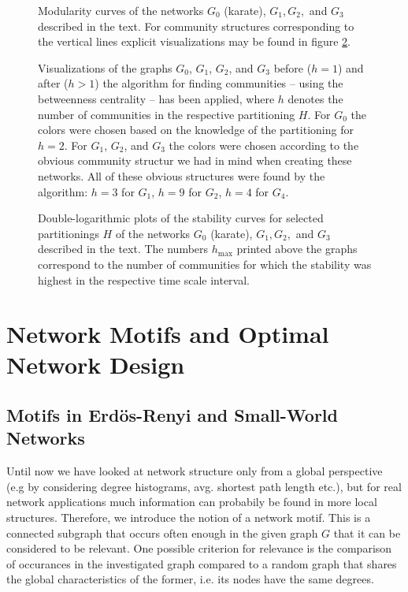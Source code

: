 \documentclass{scrartcl}
\begin{document}
\begin{figure}[bcht]
    \centering
    \caption{Modularity curves of the networks $G_0$ (karate), $G_1, G_2,$
        and $G_3$ described in the text. For community structures
        corresponding to the vertical lines explicit visualizations may be
        found in figure \ref{fig:12_gr}.}
    \label{fig:12_mod}
\end{figure}


\begin{figure}
    \centering
    \def\svgwidth{0.8\textwidth}
    
    \caption{Visualizations of the graphs $G_0$, $G_1$, $G_2$, and $G_3$
    before ($h = 1$) and after ($h > 1$) the algorithm for finding
    communities -- using the betweenness centrality -- has been applied,
    where $h$ denotes the number of communities in the respective
    partitioning $H$. For $G_0$ the colors were chosen based on the
    knowledge of the partitioning for $h=2$.  For $G_1$, $G_2$, and $G_3$
    the colors were chosen according to the obvious community
    structur we had in mind when creating these networks. All of these
    obvious structures were found by the algorithm: $h = 3$ for $G_1$,
    $h=9$ for $G_2$, $h=4$ for $G_4$.}
    \label{fig:12_gr}
\end{figure}


\begin{figure}
    \centering
    \caption{Double-logarithmic plots of the stability curves for selected
    partitionings $H$ of the networks $G_0$ (karate), $G_1, G_2,$ and
    $G_3$ described in the text. The numbers $h_\mathrm{max}$ printed above
    the graphs correspond to the number of communities for which the
    stability was highest in the respective time scale interval.}
    \label{fig:13}
\end{figure}

\section{Network Motifs and Optimal Network Design}
\subsection{Motifs in Erdös-Renyi and Small-World Networks}
Until now we have looked at network structure only from a global
perspective (e.g by considering degree histograms, avg. shortest path
length etc.), but for real network applications much information can
probabily be found in more local structures. Therefore, we introduce the
notion of a network motif. This is a connected subgraph that occurs often
enough in the given graph $G$ that it can be considered to be relevant.
One possible criterion for relevance is the comparison of occurances in the
investigated graph compared to a random graph that shares the global 
characteristics of the former, i.e. its nodes have the same degrees.
\end{document}
